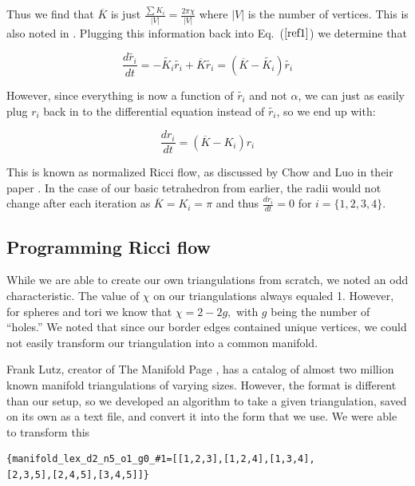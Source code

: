 \documentclass[12pt]{article}
\begin{document}
\noindent Thus we find that $\overline{K}$ is just $\displaystyle\frac{\sum{K_i}}{|V|} = \frac{2\pi \chi}{|V|}$ where $|V|$ is the number of vertices. This is also noted in \cite{chowluo}. Plugging this information back into Eq.~($\ref{ref1}$) we determine that

\begin{equation}
\frac{d\tilde{r_i}}{dt} = -\tilde{K_i}\tilde{r_i} + \overline{K}\tilde{r_i} = (\overline{K} - \tilde{K_i})\tilde{r_i}
\end{equation}

\noindent However, since everything is now a function of $\tilde{r_i}$ and not $\alpha$, we can just as easily plug $r_i$ back in to the differential equation instead of $\tilde{r_i}$, so we end up with:

\begin{equation}
\label{Riccin}
\frac{dr_i}{dt} = (\overline{K} - K_i)r_i
\end{equation}

\noindent This is known as normalized Ricci flow, as discussed by Chow and Luo in their paper \cite{chowluo}. In the case of our basic tetrahedron from earlier, the radii would not change after each iteration as $\overline{K} = K_i = \pi$ and thus $\displaystyle\frac{dr_i}{dt} = 0$ for $i = \{1,2,3,4\}$. 

\subsection{Programming Ricci flow}

\noindent While we are able to create our own triangulations from scratch, we noted an odd characteristic. The value of $\chi$ on our triangulations always equaled 1. However, for spheres and tori we know that $\chi = 2 - 2g,$ with $g$ being the number of ``holes.'' We noted that since our border edges contained unique vertices, we could not easily transform our triangulation into a common manifold.\newline

\noindent Frank Lutz, creator of The Manifold Page \cite{lutzmanifold}, has a catalog of almost two million known manifold triangulations of varying sizes. However, the format is different than our setup, so we developed an algorithm to take a given triangulation, saved on its own as a text file, and convert it into the form that we use. We were able to transform this
  
\begin{verbatim}{manifold_lex_d2_n5_o1_g0_#1=[[1,2,3],[1,2,4],[1,3,4],
[2,3,5],[2,4,5],[3,4,5]]}
\end{verbatim}
 
\end{document}
